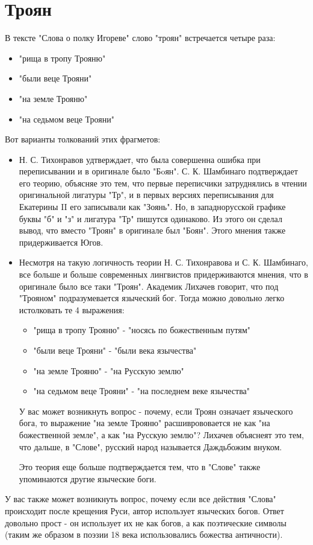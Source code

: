 \documentclass[14pt, a4paper]{article}
\begin{document}
{\section{Троян}
В тексте "Слова о полку Игореве" слово "троян" встречается четыре раза:
\begin{itemize}
  \item "рища в тропу Трояню"
  \item "были веце Трояни"
  \item "на земле Трояню"
  \item "на седьмом веце Трояни"
\end{itemize}
Вот варианты толкований этих фрагметов:
\begin{itemize}
    \item Н. С. Тихонравов удтверждает, что была совершенна ошибка при переписывании и в оригинале было "Бoян". С. К. Шамбинаго подтверждает его теорию, объясняе это тем, что первые переписчики затруднялись в чтении оригинальной лигатуры "Тр", и в первых версиях переписывания для Екатерины II его записывали как "Зоянь". Но, в западнорусской графике буквы "б" и "з" и лигатура "Тр" пишутся одинаково. Из этого он сделал вывод, что вместо "Троян" в оригинале был "Боян". Этого мнения также придерживается Югов.
    \item Несмотря на такую логичность теории Н. С. Тихонравова и С. К. Шамбинаго, все больше и больше современных лингвистов придерживаются мнения, что в оригинале было все таки "Троян". Академик Лихачев говорит, что под "Трояном" подразумевается языческий бог. Тогда можно довольно легко истолковать те 4 выражения:
    \begin{itemize}
      \item "рища в тропу Трояню" - "носясь по божественным путям"
      \item "были веце Трояни" - "были века язычества"
      \item "на земле Трояню" - "на Русскую землю"
      \item "на седьмом веце Трояни" - "на последнем веке язычества"
    \end{itemize}
    У вас может возникнуть вопрос - почему, если Троян означает языческого бога, то выражение "на земле Трояню" расшиврововается не как "на божественной земле", а как "на Русскую землю"? Лихачев объяснеят это тем, что дальше, в "Слове", русский народ называется Даждьбожим внуком.
    \par Это теория еще больше подтверждается тем, что в "Слове" также упоминаются другие языческие боги.
\end{itemize}
У вас также может возникнуть вопрос, почему если все действия "Слова" происходит после крещения Руси, автор использует языческих богов. Ответ довольно прост - он использует их не как богов, а как поэтические символы (таким же образом в поэзии 18 века использовались божества античности).

}
\end{document}
